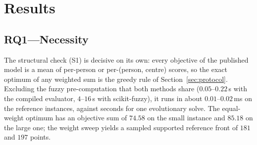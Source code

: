 \documentclass[systems,article,accept,moreauthors,pdftex]{Definitions/mdpi}
\begin{document}
\section{Results}\label{sec:results}

\subsection{RQ1---Necessity}\label{sec:rq1}
The structural check (S1) is decisive on its own: every objective of the published model
is a mean of per-person or per-(person, centre) scores, so the exact optimum of any
weighted sum is the greedy rule of Section~\ref{sec:protocol}. Excluding the fuzzy
pre-computation that both methods share ($0.05$--$0.22$\,s with the compiled evaluator,
$4$--$16$\,s with scikit-fuzzy), it runs in
about $0.01$--$0.02$\,ms on the reference instances, against seconds for one evolutionary
solve.
The equal-weight optimum has an objective sum of $74.58$ on the small instance and $85.18$
on the large one; the weight sweep yields a sampled supported reference front of $181$ and
$197$ points.
\end{document}
